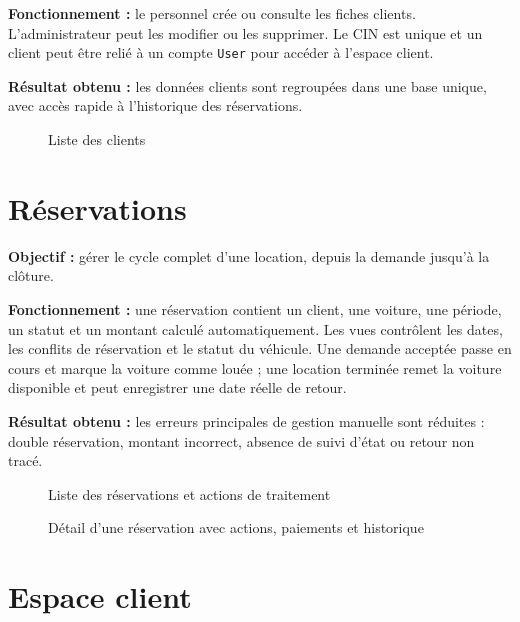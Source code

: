 \textbf{Fonctionnement :} le personnel crée ou consulte les fiches clients. L'administrateur peut les modifier ou les supprimer. Le CIN est unique et un client peut être relié à un compte \texttt{User} pour accéder à l'espace client.

\textbf{Résultat obtenu :} les données clients sont regroupées dans une base unique, avec accès rapide à l'historique des réservations.

\begin{figure}[H]
\centering
{}
\caption{Liste des clients}
\end{figure}

\section{Réservations}

\textbf{Objectif :} gérer le cycle complet d'une location, depuis la demande jusqu'à la clôture.

\textbf{Fonctionnement :} une réservation contient un client, une voiture, une période, un statut et un montant calculé automatiquement. Les vues contrôlent les dates, les conflits de réservation et le statut du véhicule. Une demande acceptée passe en cours et marque la voiture comme louée ; une location terminée remet la voiture disponible et peut enregistrer une date réelle de retour.

\textbf{Résultat obtenu :} les erreurs principales de gestion manuelle sont réduites : double réservation, montant incorrect, absence de suivi d'état ou retour non tracé.

\begin{figure}[H]
\centering
{}
\caption{Liste des réservations et actions de traitement}
\end{figure}

\begin{figure}[H]
\centering
{}
\caption{Détail d'une réservation avec actions, paiements et historique}
\end{figure}

\section{Espace client}

